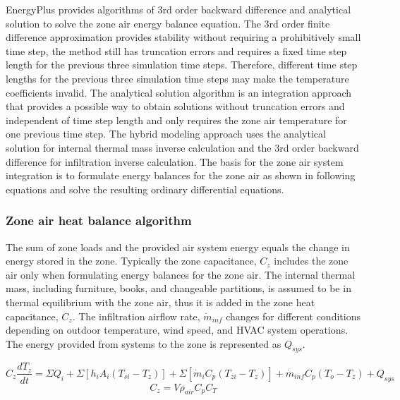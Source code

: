 EnergyPlus provides algorithms of 3rd order backward difference and analytical solution to solve the zone air energy balance equation. The 3rd order finite difference approximation provides stability without requiring a prohibitively small time step, the method still has truncation errors and requires a fixed time step length for the previous three simulation time steps. Therefore, different time step lengths for the previous three simulation time steps may make the temperature coefficients invalid. The analytical solution algorithm is an integration approach that provides a possible way to obtain solutions without truncation errors and independent of time step length and only requires the zone air temperature for one previous time step. The hybrid modeling approach uses the analytical solution for internal thermal mass inverse calculation and the 3rd order backward difference for infiltration inverse calculation. The basis for the zone air system integration is to formulate energy balances for the zone air as shown in following equations and solve the resulting ordinary differential equations. 

\subsubsection{Zone air heat balance algorithm}\label{Zone-air-heat-balance-algorithm}
The sum of zone loads and the provided air system energy equals the change in energy stored in the zone. Typically the zone capacitance, $C_z$ includes the zone air only when formulating energy balances for the zone air. The internal thermal mass, including furniture, books, and changeable partitions, is assumed to be in thermal equilibrium with the zone air, thus it is added in the zone heat capacitance, $C_z$.  The infiltration airflow rate, $\dot{m}_{inf}$ changes for different conditions depending on outdoor temperature, wind speed, and HVAC system operations. The energy provided from systems to the zone is represented as $Q_{sys}$.

\begin{equation}
C_z \frac {dT_z} {dt} = \Sigma Q_i +\Sigma[h_i A_i (T_{si} - T_z)] + \Sigma [\dot{m}_i C_p (T_{zi}-T_z)] + \dot{m}_{inf} C_p (T_o - T_z) + Q_{sys}
\end{equation}
\begin{equation}
C_z = V \rho_{air} C_p C_T
\end{equation}

